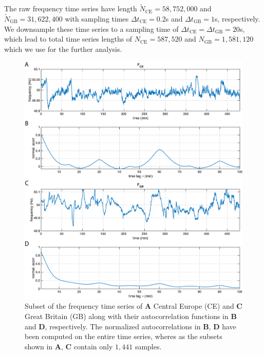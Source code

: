 \documentclass[entropy,article,submit,pdftex,moreauthors]{Definitions/mdpi}
\begin{document}
The raw frequency time series have length $\tilde{N}_{\text{CE}}=58,752,000$ and $\tilde{N}_{\text{GB}}=31,622,400$ with sampling times $\Delta t_{\text{CE}}=0.2$\si{s} and 
$\Delta t_{\text{GB}}=1$\si{s}, respectively.  
We downsample these time series to a sampling time of $\Delta t_{\text{CE}}= \Delta t_{\text{GB}}=20$\si{s}, which lead to total time series lengths of 
$N_{\text{CE}}=587,520$ and $N_{\text{GB}}=1,581,120$ which we use for the further analysis.

\begin{figure}
 \centering
 \includegraphics[width=\textwidth]{./figures/fig_power_grid_time_series}
 \caption{Subset of the frequency time series of \textbf{A} Central Europe (CE) and \textbf{C} Great Britain (GB) along with their autocorrelation functions in \textbf{B} and 
 \textbf{D}, respectively. The normalized autocorrelations in \textbf{B}, \textbf{D} have been computed on the entire time series, wheres as the subsets shown in \textbf{A}, \textbf{C} 
 contain only $1,441$ samples.}
\label{fig_power_grid_time_series}
\end{figure}
\end{document}
